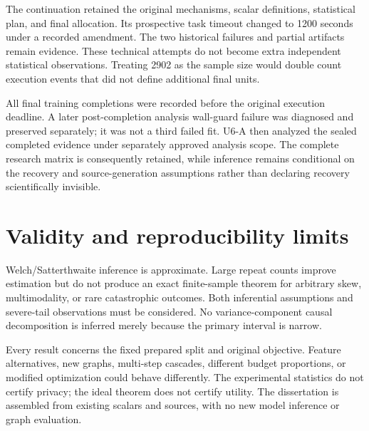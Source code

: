 The continuation retained the original mechanisms, scalar definitions, statistical plan, and final allocation. Its prospective task timeout changed to 1200 seconds under a recorded amendment. The two historical failures and partial artifacts remain evidence. These technical attempts do not become extra independent statistical observations. Treating 2902 as the sample size would double count execution events that did not define additional final units.

All final training completions were recorded before the original execution deadline. A later post-completion analysis wall-guard failure was diagnosed and preserved separately; it was not a third failed fit. U6-A then analyzed the sealed completed evidence under separately approved analysis scope. The complete research matrix is consequently retained, while inference remains conditional on the recovery and source-generation assumptions rather than declaring recovery scientifically invisible.

\section{Validity and reproducibility limits}
Welch/Satterthwaite inference is approximate. Large repeat counts improve estimation but do not produce an exact finite-sample theorem for arbitrary skew, multimodality, or rare catastrophic outcomes. Both inferential assumptions and severe-tail observations must be considered. No variance-component causal decomposition is inferred merely because the primary interval is narrow.

Every result concerns the fixed prepared split and original objective. Feature alternatives, new graphs, multi-step cascades, different budget proportions, or modified optimization could behave differently. The experimental statistics do not certify privacy; the ideal theorem does not certify utility. The dissertation is assembled from existing scalars and sources, with no new model inference or graph evaluation.
